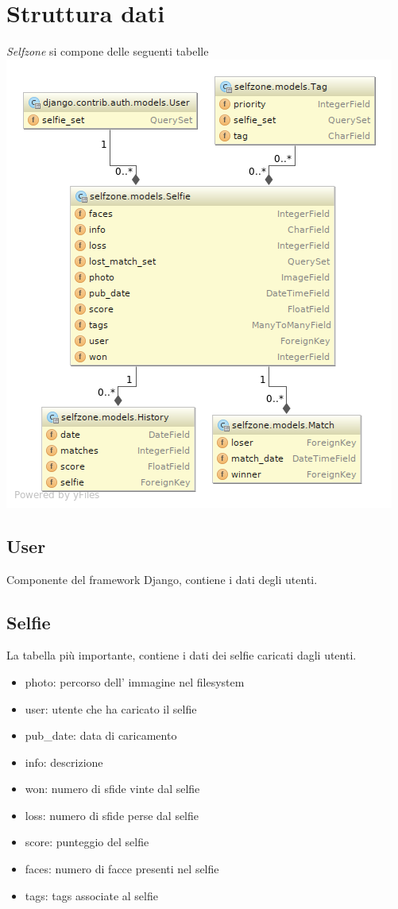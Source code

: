 \documentclass{article}
\newcommand{\proj}{\textit{Selfzone }}
\begin{document}
\section{Struttura dati}
\proj si compone delle seguenti tabelle\\
\includegraphics[width=\textwidth]{res/models_diagram.png}
\clearpage

\subsection{User}
Componente del framework Django, contiene i dati degli utenti.

\subsection{Selfie}
La tabella più importante, contiene i dati dei selfie caricati dagli utenti.
\begin{itemize}
\item photo: percorso dell' immagine nel filesystem
\item user: utente che ha caricato il selfie
\item pub\_date: data di caricamento
\item info: descrizione
\item won: numero di sfide vinte dal selfie
\item loss: numero di sfide perse dal selfie
\item score: punteggio del selfie
\item faces: numero di facce presenti nel selfie
\item tags: tags associate al selfie
\end{itemize}
\end{document}
